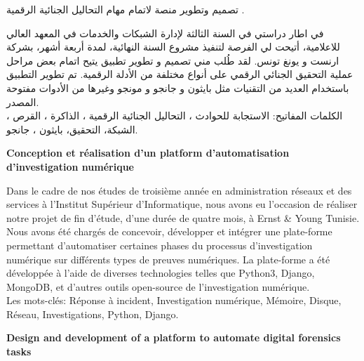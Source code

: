 \newpage
\thispagestyle{empty}
\begin{arabtext}
\hspace{-0.6cm}تصميم وتطوير منصة لاتمام مهام التحاليل الجنائية الرقمية .
\end{arabtext}
\hspace{-0.6cm}\hrulefill
\begin{arabtext}
\hspace{-0.6cm}في اطار دراستي في السنة الثالثة لإدارة الشبكات والخدمات في المعهد العالي للاعلامية، أتيحت لي الفرصة لتنفيذ مشروع السنة النهائية، لمدة أربعة أشهر، بشركة ارنست و يونغ تونس. لقد طُلب مني تصميم و تطوير تطبيق يتيح اتمام بعض مراحل عملية التحقيق الجنائي الرقمي على أنواع مختلفة من الأدلة الرقمية. تم تطوير التطبيق باستخدام العديد من التقنيات مثل بايثون و جانجو و مونجو وغيرها من الأدوات مفتوحة المصدر.\\الكلمات المفاتيح: الاستجابة للحوادث ، التحاليل الجنائية الرقمية ، الذاكرة ، القرص ، الشبكة، التحقيق، بايثون ، جانجو.\vspace{0.5cm}
\end{arabtext}

\hspace{-0.6cm}\textbf{Conception et réalisation d'un platform d'automatisation d'investigation numérique}

\hspace{-0.6cm}\hrulefill

\hspace{-0.6cm}Dans le cadre de nos études de troisième année en administration réseaux et des services à l’Institut Supérieur d’Informatique, nous avons eu l’occasion de réaliser notre projet de fin d'étude, d’une durée de quatre mois, à Ernst \& Young Tunisie. Nous avons été chargés de concevoir, développer et intégrer une plate-forme permettant d'automatiser certaines phases du processus d'investigation numérique sur différents types de preuves numériques. La plate-forme a été développée à l'aide de diverses technologies telles que Python3, Django, MongoDB, et d'autres outils open-source de l'investigation numérique.\\Les mots-clés: Réponse à incident, Investigation numérique, Mémoire, Disque, Réseau, Investigations, Python, Django.
\vspace{0.5cm}

\hspace{-0.6cm}\textbf{Design and development of a platform to automate digital forensics tasks}

